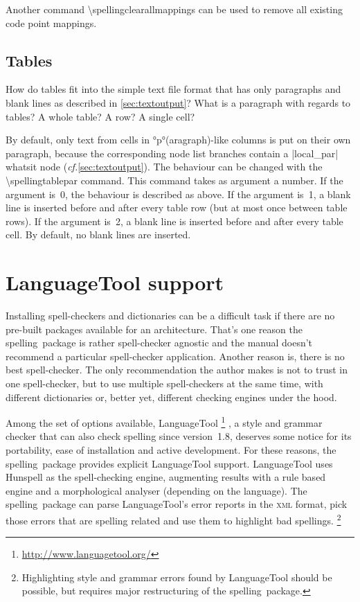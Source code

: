 \documentclass[11pt]{article}
\newcommand*{\pkg}{\textsf{spelling}}
\newcommand*{\acr}[1]{\mbox{\scshape#1}}
\newcommand*{\cmd}[1]{\mbox{\ttfamily\textbackslash#1}}
\newcommand*{\macro}[1]{\cmd{#1}\marginpar{\cmd{#1}}}
\newcommand*{\latinphrase}[1]{\foreignlanguage{latin}{\emph{#1}}}
\newcommand*{\lpcf}{\latinphrase{cf.}\xspace}
\begin{document}
Another command \macro{spellingclearallmappings} can be used to remove
all existing code point mappings.


\subsection{Tables}
\label{sec:tables}

How do tables fit into the simple text file format that has only
paragraphs and blank lines as described in \autoref{sec:textoutput}?
What is a paragraph with regards to tables?  A whole table?  A row?  A
single cell?

By default, only text from cells in °p°(aragraph)-like columns is put on
their own paragraph, because the corresponding node list branches
contain a |local_par| whatsit node (\lpcf \autoref{sec:textoutput}).
The behaviour can be changed with the \macro{spellingtablepar} command.
This command takes as argument a number.  If the argument is~0, the
behaviour is described as above.  If the argument is~1, a blank line is
inserted before and after every table row (but at most once between
table rows).  If the argument is~2, a blank line is inserted before and
after every table cell.  By default, no blank lines are inserted.


\section{LanguageTool support}
\label{sec:languagetool}

Installing spell-checkers and dictionaries can be a difficult task if
there are no pre-built packages available for an architecture.  That's
one reason the \pkg\ package is rather spell-checker agnostic and the
manual doesn't recommend a particular spell-checker application.
Another reason is, there is no best spell-checker.  The only
recommendation the author makes is not to trust in one spell-checker,
but to use multiple spell-checkers at the same time, with different
dictionaries or, better yet, different checking engines under the hood.

Among the set of options available, LanguageTool%
\footnote{\url{http://www.languagetool.org/}}%
%
, a style and grammar checker that can also check spelling since
version~1.8, deserves some notice for its portability, ease of
installation and active development.  For these reasons, the \pkg\
package provides explicit LanguageTool support.  LanguageTool uses
Hunspell as the spell-checking engine, augmenting results with a rule
based engine and a morphological analyser (depending on the language).
The \pkg\ package can parse LanguageTool's error reports in the
\acr{xml} format, pick those errors that are spelling related and use
them to highlight bad spellings.%
\footnote{Highlighting style and grammar errors found by LanguageTool
  should be possible, but requires major restructuring of the \pkg\
  package.}
\end{document}
